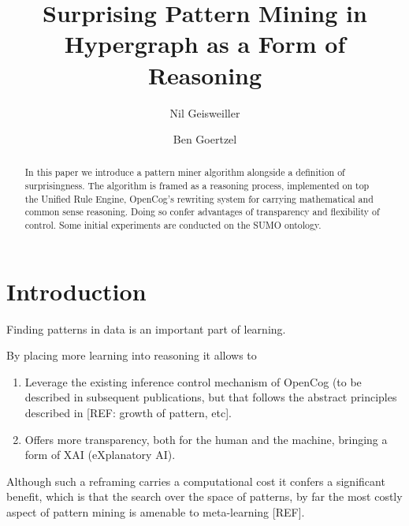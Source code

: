 \documentclass[runningheads]{llncs}
\begin{document}
%
\title{Surprising Pattern Mining in Hypergraph as a Form of Reasoning}
%
%
\author{Nil Geisweiller \and
Ben Goertzel}
%
%
%
\maketitle              %
%

\begin{abstract}
  In this paper we introduce a pattern miner algorithm alongside a
  definition of surprisingness. The algorithm is framed as a reasoning
  process, implemented on top the Unified Rule Engine, OpenCog's
  rewriting system for carrying mathematical and common sense
  reasoning. Doing so confer advantages of transparency and
  flexibility of control. Some initial experiments are conducted on
  the SUMO ontology.  
\end{abstract}

\section{Introduction}

Finding patterns in data is an important part of learning.

By placing more learning into reasoning it allows to

\begin{enumerate}
\item Leverage the existing inference control mechanism of OpenCog (to be
described in subsequent publications, but that follows the abstract
principles described in [REF: growth of pattern, etc].
\item Offers more transparency, both for the human and the machine,
  bringing a form of XAI (eXplanatory AI).
\end{enumerate}
Although such a reframing carries a computational cost it confers a
significant benefit, which is that the search over the space of
patterns, by far the most costly aspect of pattern mining is amenable
to meta-learning [REF].
\end{document}
